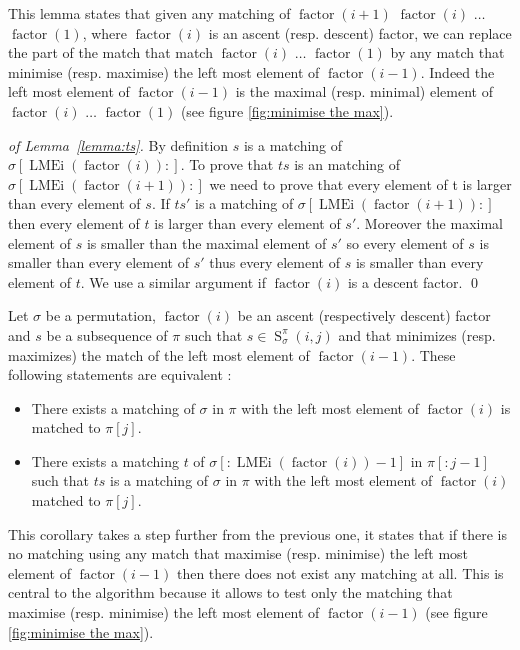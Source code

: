 \documentclass[a4paper]{llncs}
\newcommand{\ptext}{\pi}
\newcommand{\ppattern}{\sigma}
\DeclareMathOperator{\LMEi}{LMEi}
\DeclareMathOperator{\factor}{factor}
\DeclareMathOperator{\SETa}{S}
\newcommand{\SET}[4]{\SETa_{{#1}}^{{#2}}({#3},{#4})}
\begin{document}
This lemma states that given any matching of $\factor(i+1)$ $\factor(i)$ $\ldots$ $\factor(1)$,
where $\factor(i)$ is an ascent (resp. descent) factor,
we can replace the part of the match that match $\factor(i)$ $\ldots$ $\factor(1)$ by any match
that minimise (resp. maximise) the left most element of $\factor(i-1)$. Indeed the left most element of $\factor(i-1)$ is the maximal (resp. minimal) element of  $\factor(i)$ $\ldots$ $\factor(1)$ (see figure \ref{fig:minimise the max}). 

\begin{proof}[of Lemma~\ref{lemma:ts}]
	By definition $s$ is a matching of $\ppattern[\LMEi(\factor(i)):]$. To prove that $ts$ is an matching of $\ppattern[\LMEi(\factor(i+1)):]$ we need to prove that every element of t is larger than every element of $s$. If $ts'$ is a matching of $\ppattern[\LMEi(\factor(i+1)):]$ then every element of $t$ is larger than every element of $s'$. Moreover the maximal element of $s$ is smaller than  the maximal element of $s'$ so every element of $s$ is smaller than every element of $s'$ thus every element of $s$ is smaller than every element of $t$. We use a similar argument if $\factor(i)$ is a descent factor.
	\qed
\end{proof}

\begin{corollary}
\label{corollary:we can chose a matching}	
Let $\ppattern$ be a permutation, 
$\factor(i)$ be an ascent (respectively descent) factor
and 
$s$ be a subsequence of $\pi$ such that $s \in \SET{\ppattern}{\ptext}{i}{j}$ and
that minimizes (resp. maximizes) the match of the left most element of $\factor(i-1)$.
These following statements are equivalent :
\begin{itemize}
	\item There exists a 
	matching of $\ppattern$ in $\ptext$ with the left most element of $\factor(i)$ is matched to $\ptext[j]$.
	\item There exists a matching $t$ of $\sigma[:\LMEi(\factor(i))-1]$ in $\ptext[:j-1]$  such that $ts$ is a matching of $\ppattern$ in $\ptext$ with the left most element of $\factor(i)$ matched to $\ptext[j]$.
\end{itemize}
\end{corollary}

This corollary takes a step further from the previous one, it states that if there is no matching using any match that maximise (resp. minimise) the left most element of $\factor(i-1)$ then there does not exist any matching at all. This is central to the algorithm because it allows to test only the matching that  maximise (resp. minimise) the left most element of $\factor(i-1)$ (see figure \ref{fig:minimise the max}).
\end{document}

